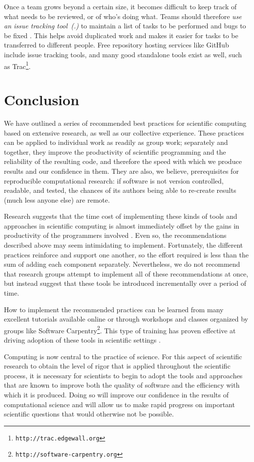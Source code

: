 \documentclass{pnastwo}
\newcommand{\footurl}[1]{\footnote{\texttt{#1}}}
\newcounter{PracticeSection}
\newcounter{PracticeIdentifier}[PracticeSection]
\newcommand{\practice}[1]{\stepcounter{PracticeIdentifier}\emph{{#1}~(\arabic{PracticeSection}.\arabic{PracticeIdentifier})}}
\begin{document}
\begin{article}
Once a team grows beyond a certain size, it becomes difficult to keep
track of what needs to be reviewed, or of who's doing what.  Teams
should therefore \practice{use an issue tracking tool} to maintain a
list of tasks to be performed and bugs to be fixed
\cite{dubois2003a}. This helps avoid duplicated work and makes it
easier for tasks to be transferred to different people. Free
repository hosting services like GitHub include issue tracking tools,
and many good standalone tools exist as well, such as
Trac\footurl{http://trac.edgewall.org}.

\section{Conclusion}\label{conclusion}

We have outlined a series of recommended best practices for scientific
computing based on extensive research, as well as our collective
experience.  These practices can be applied to individual work as
readily as group work; separately and together, they improve the
productivity of scientific programming and the reliability of the
resulting code, and therefore the speed with which we produce results
and our confidence in them.  They are also, we believe, prerequisites
for reproducible computational research: if software is not version
controlled, readable, and tested, the chances of its authors being
able to re-create results (much less anyone else) are remote.

Research suggests that the time cost of implementing these kinds of
tools and approaches in scientific computing is almost immediately
offset by the gains in productivity of the programmers involved
\cite{aranda2012}. Even so, the recommendations described above may
seem intimidating to implement.  Fortunately, the different practices
reinforce and support one another, so the effort required is less than
the sum of adding each component separately. Nevertheless, we do not
recommend that research groups attempt to implement all of these
recommendations at once, but instead suggest that these tools be
introduced incrementally over a period of time.

How to implement the recommended practices can be learned from many
excellent tutorials available online or through workshops and classes
organized by groups like Software
Carpentry\footurl{http://software-carpentry.org}. This type of
training has proven effective at driving adoption of these tools in
scientific settings \cite{aranda2012}.

Computing is now central to the practice of science. For this aspect
of scientific research to obtain the level of rigor that is applied
throughout the scientific process, it is necessary for scientists to
begin to adopt the tools and approaches that are known to improve both
the quality of software and the efficiency with which it is
produced. Doing so will improve our confidence in the results of
computational science and will allow us to make rapid progress on
important scientific questions that would otherwise not be possible.




\end{article}
\end{document}
